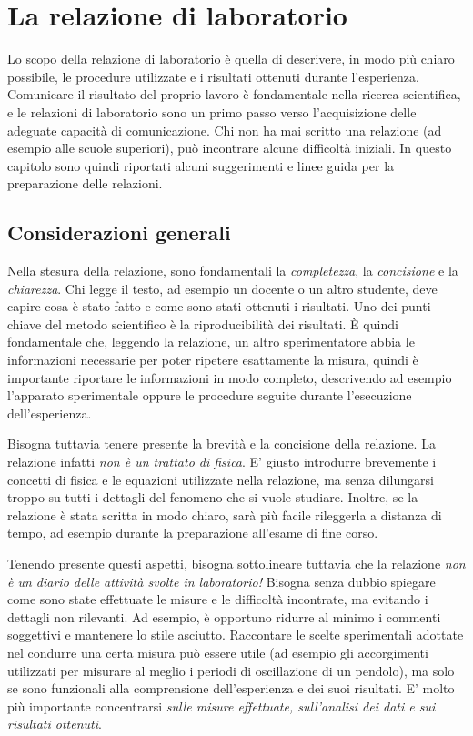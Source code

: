 \chapter{La relazione di laboratorio}

Lo scopo della relazione di laboratorio è quella di descrivere, in modo più
chiaro possibile, le procedure utilizzate e i risultati ottenuti durante
l'esperienza. Comunicare il risultato del proprio lavoro è fondamentale nella
ricerca scientifica, e le relazioni di laboratorio sono un primo passo verso
l'acquisizione delle adeguate capacità di comunicazione.
Chi non ha mai scritto una relazione (ad esempio alle scuole superiori), può
incontrare alcune difficoltà iniziali. In questo capitolo sono quindi
riportati alcuni suggerimenti e linee guida per la preparazione delle relazioni.


\section{Considerazioni generali}
\label{sec:relazione_considerazioni}

Nella stesura della relazione, sono fondamentali la \emph{completezza},
la \emph{concisione} e la \emph{chiarezza}. Chi legge il testo, ad esempio un
docente o un altro studente, deve capire cosa è stato fatto e come sono stati
ottenuti i risultati.
Uno dei punti chiave del metodo scientifico è la riproducibilità dei
risultati. \`E quindi fondamentale che, leggendo la relazione, un altro
sperimentatore abbia le informazioni necessarie per poter ripetere esattamente
la misura, quindi è importante riportare le informazioni in modo completo,
descrivendo ad esempio l'apparato sperimentale oppure le procedure seguite
durante l'esecuzione dell'esperienza.

Bisogna tuttavia tenere presente la brevità e la concisione della relazione.
La relazione infatti \emph{non è un trattato di fisica}. E' giusto introdurre
brevemente i concetti di fisica e le equazioni utilizzate nella relazione, ma
senza dilungarsi troppo su tutti i dettagli del fenomeno che si vuole studiare.
Inoltre, se la relazione è stata scritta in modo chiaro, sarà più facile
rileggerla a distanza di tempo, ad esempio durante la preparazione all'esame
di fine corso.

Tenendo presente questi aspetti, bisogna sottolineare tuttavia che la relazione
\emph{non è un diario delle attività svolte in laboratorio!} Bisogna senza
dubbio spiegare come sono state effettuate le misure e le difficoltà
incontrate, ma evitando i dettagli non rilevanti. Ad esempio, è opportuno
ridurre al minimo i commenti soggettivi e mantenere lo stile asciutto.
Raccontare le scelte sperimentali adottate nel condurre una certa misura può
essere utile (ad esempio gli accorgimenti utilizzati per misurare al meglio i
periodi di oscillazione di un pendolo), ma solo se sono funzionali alla
comprensione dell'esperienza e dei suoi risultati. E' molto più importante
concentrarsi \emph{sulle misure effettuate, sull'analisi dei dati e sui
  risultati ottenuti}.


